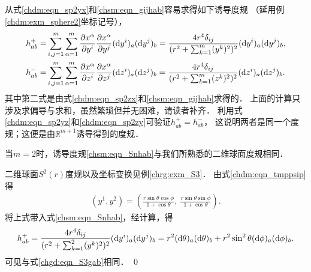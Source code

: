从式\eqref{chdm:eqn_sp2yx}和\eqref{chsm:eqn_gijhab}容易求得如下诱导度规
（延用例\ref{chdm:exm_sphere2}坐标记号），
\setlength{\mathindent}{0em}
\begin{align}
    h^{+}_{ab}=& \sum_{i,j=1}^{m}\sum_{\alpha=1}^{m}\frac{\partial x^\alpha}{\partial y^i}
    \frac{\partial x^\alpha}{\partial y^j} ({\rm d}y^i)_a ({\rm d}y^j)_b
    = \frac{4r^4 \delta_{ij}} {(r^2+\sum\nolimits_{k=1}^{m} (y^k)^2)^2}
    ({\rm d}y^i)_a ({\rm d}y^j)_b , \label{chsm:eqn_Snhab} \\
    h^{-}_{ab}=& \sum_{i,j=1}^{m}\sum_{\alpha=1}^{m}\frac{\partial x^\alpha}{\partial z^i}
    \frac{\partial x^\alpha}{\partial z^j} ({\rm d}z^i)_a ({\rm d}z^j)_b
    = \frac{4r^4 \delta_{ij}} {(r^2+\sum\nolimits_{k=1}^{m} (z^k)^2)^2}
    ({\rm d}z^i)_a ({\rm d}z^j)_b .
\end{align}\setlength{\mathindent}{2em}
其中第二式是由式\eqref{chdm:eqn_sp2zx}和\eqref{chsm:eqn_gijhab}求得的．
上面的计算只涉及求偏导与求和，虽然繁琐但并无困难，请读者补齐．
利用式\eqref{chdm:eqn_sp2yz}和\eqref{chdm:eqn_sp2zy}可验证$h^{+}_{ab}=h^{-}_{ab}$，
这说明两者是同一个度规；这便是由$\mathbb{R}^{m+1}$诱导得到的度规．

\begin{example}\label{chsm:exm_S2}
    当$m=2$时，诱导度规\eqref{chsm:eqn_Snhab}与我们所熟悉的二维球面度规相同．
\end{example}
二维球面$S^2(r)$度规以及坐标变换见例\ref{chrg:exm_S3}．
由式\eqref{chdm:eqn_tmppsip}得
\begin{align}
    (y^1,y^2) %
    = \left(\frac{r\sin\theta \cos\phi }{1+\cos\theta},\ \frac{r\sin\theta \sin\phi}{1+\cos\theta}\right) .
\end{align}
将上式带入式\eqref{chsm:eqn_Snhab}，经计算，得
\begin{align*}
    h^{+}_{ab}= \frac{4r^4 \delta_{ij}} {(r^2+\sum\nolimits_{k=1}^{2} (y^k)^2)^2}
    ({\rm d}y^i)_a ({\rm d}y^j)_b 
    =  r^2 ({\rm d}\theta )_a ({\rm d}\theta )_b 
    + r^2\sin^2 \theta  ({\rm d}\phi )_a ({\rm d}\phi )_b .
\end{align*}
可见与式\eqref{chgd:eqn_S3gab}相同．  \qed

